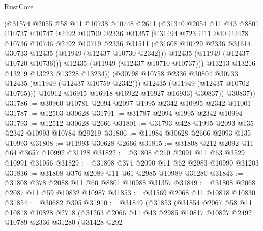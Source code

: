 \begin{lexlean}{RustCore}
\begin{coremodule}
                  (@31574
                    @2055
                    @58
                    @11
                    @10738
                    @10748
                    @2611
                    (@31340
                      @2054
                      @11
                      @43
                      @8801
                      @10737
                      @10747
                      @2492
                      @10709
                      @2336
                      @31357
                      (@31494
                        @723
                        @11
                        @40
                        @2478
                        @10736
                        @10746
                        @2492
                        @10719
                        @2336
                        @31511
                        (@31608 @10729 @2336 @31614 @30733 @12435 (@11949 (@12437 @10730 @2342)))
                        @12435
                        (@11949 (@12437 @10720 @10736)))
                      @12435
                      (@11949 (@12437 @10710 @10737)))
                    @13213
                    @13216
                    @13219
                    @13223
                    @13228
                    @13234))
                (@30798 @10758 @2336 @30804 @30733 @12435 (@11949 (@12437 @10759 @2342)))
                @12435
                (@11949 (@12437 @10702 @10765)))
              @16912
              @16915
              @16918
              @16922
              @16927
              @16933)
            @30837))
        @30837))
@31786 := @30960 @10781 @2094 @2097 @1995 @2342 @10995 @2342 @11001
@31787 := @12503 @30628
@31791 := @31787 @2094 @1995 @2342 @10994
@31793 := @12512 @30628 @2666
@31801 := @31793 @428 @1995 @2093 @135 @2342 @10993 @10784 @29219
@31806 := @11984 @30628 @2666 @2093 @135 @10993
@31808 := @11993 @30628 @2666
@31815 := @31808 @212 @2092 @11 @64 @3657 @10992 @31128
@31822 := @31808 @210 @2091 @11 @63 @3529 @10991 @31056
@31829 := @31808 @374 @2090 @11 @62 @2983 @10990 @31203
@31836 := @31808 @376 @2089 @11 @61 @2985 @10989 @31280
@31843 := @31808 @378 @2088 @11 @60 @8801 @10988 @31357
@31849 := @31808 @2068 @2087 @11 @59 @10832 @10987
@31853 := @31569 @2068 @11 @10818 @10830
@31854 := @30682 @305
@31910 := @31849
    (@31853
      (@31854
        @2067
        @58
        @11
        @10818
        @10828
        @2718
        (@31263
          @2066
          @11
          @43
          @2985
          @10817
          @10827
          @2492
          @10789
          @2336
          @31280
          (@31428
            @292

\end{coremodule}
\end{lexlean}
